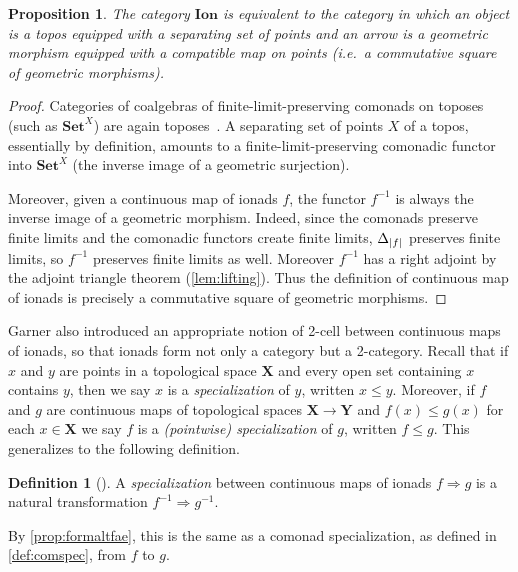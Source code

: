 \documentclass[11pt, oneside, article]{memoir}
\theoremstyle{plain}
\newtheorem{proposition}[theorem]{Proposition}
\theoremstyle{definition}
\newtheorem{definition}[def]{Definition}
\theoremstyle{remark}
\DeclarePairedDelimiter{\abs}{\lvert}{\rvert}
\newcommand{\namedcat}[1]{\mathbf{#1}}
\newcommand{\spa}[1]{\mathbf{#1}}
\newcommand{\Set}{\namedcat{Set}}
\newcommand{\pts}[1]{{\abs{#1}}}
\newcommand{\one}[1]{\pts{#1}}
\newcommand{\reindex}[1]{\Delta_{#1}}
\newcommand{\conion}[1]{{#1}^{-1}}
\newcommand{\IonadO}{\namedcat{Ion}}
\newcommand{\xX}{X}
\newcommand{\tX}{\spa{X}}
\newcommand{\tY}{\spa{Y}}
\begin{document}
\begin{proposition}\label{lem:ionadtopos}
  The category $\IonadO$ is equivalent to the category in which an
  object is a topos equipped with a separating set of points and an
  arrow is a geometric morphism equipped with a compatible map on
  points (i.e.\ a commutative square of geometric morphisms).
\end{proposition}
\begin{proof}
  Categories of coalgebras of finite-limit-preserving comonads on
  toposes (such as $\Set^\xX$) are again toposes~\cite[Theorem
  A4.2.1]{johnstone:elephant}.  A separating set of points $\xX$ of a
  topos, essentially by definition, amounts to a
  finite-limit-preserving comonadic functor into $\Set^\xX$ (the
  inverse image of a geometric surjection).

  Moreover, given a continuous map of ionads $f$, the functor
  $\conion{f}$ is always the inverse image of a geometric morphism.
  Indeed, since the comonads preserve finite limits and the comonadic
  functors create finite limits, $\reindex{\one{f}}$ preserves finite
  limits, so $\conion{f}$ preserves finite limits as well. Moreover
  $\conion{f}$ has a right adjoint by the adjoint triangle theorem
  (\cref{lem:lifting}). Thus the definition of continuous map of
  ionads is precisely a commutative square of geometric morphisms.
\end{proof}

Garner also introduced an appropriate notion of 2-cell between
continuous maps of ionads, so that ionads form not only a category but
a 2-category. Recall that if $x$ and $y$ are points in a topological
space $\tX$ and every open set containing $x$ contains $y$, then we
say $x$ is a \emph{specialization} of $y$, written $x \leq
y$. Moreover, if $f$ and $g$ are continuous maps of topological spaces
$\tX \to \tY$ and $f(x) \leq g(x)$ for each $x \in \tX$ we say $f$ is
a \emph{(pointwise) specialization} of $g$, written $f \leq g$. This
generalizes to the following definition.

\begin{definition}[{\cite[Definition 5.1]{garner:ionads}}]\label{def:ionadspecialization}
  A \emph{specialization} between continuous maps of ionads
  $f \Rightarrow g$ is a natural transformation
  $\conion{f} \Rightarrow \conion{g}$.

  By \cref{prop:formaltfae}, this is the same as a comonad
  specialization, as defined in \cref{def:comspec}, from $f$ to $g$.
\end{definition}
\end{document}
